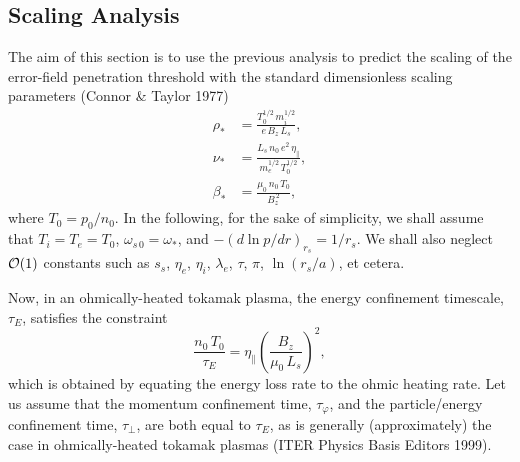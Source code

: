 \documentclass[notitlepage,12pt]{article}
\begin{document}
\subsection{Scaling Analysis}
The aim of this section is to use the previous analysis to predict the scaling of the error-field penetration
threshold with the standard dimensionless scaling parameters (Connor \& Taylor 1977)
\begin{align}
\rho_\ast &= \frac{T_0^{1/2}\,m_i^{1/2}}{e\,B_z\,L_s},\label{e428}\\[0.5ex]
\nu_\ast &= \frac{L_s\,n_0\,e^2\,\eta_\parallel}{m_e^{1/2}\,T_0^{1/2}},\\[0.5ex]
\beta_\ast&=\frac{\mu_0\,n_0\,T_0}{B_z^{\,2}},\label{e430}
\end{align}
where $T_0=p_0/n_0$. In the following, for the sake of simplicity, we
shall assume that $T_i=T_e=T_0$, $\omega_{s\,0}=\omega_\ast$, and $-(d\ln p/dr)_{r_s} = 1/r_s$. We shall also neglect ${\cal O}(1)$
constants such as $s_s$, $\eta_e$, $\eta_i$, $\lambda_e$, $\tau$, $\pi$, $\ln(r_s/a)$, et cetera.

 Now, in an ohmically-heated tokamak
plasma, the energy confinement timescale, $\tau_E$, satisfies the constraint
\begin{equation}
\frac{n_0\,T_0}{\tau_E} = \eta_\parallel\left(\frac{B_z}{\mu_0\,L_s}\right)^2,
\end{equation}
which is obtained by equating the energy loss rate to the ohmic heating rate. Let us assume that the momentum confinement
time, $\tau_\varphi$, and the particle/energy confinement time, $\tau_\perp$, are both equal to $\tau_E$, as is generally
(approximately) the case in ohmically-heated tokamak plasmas (ITER Physics Basis Editors 1999). 
\end{document}
